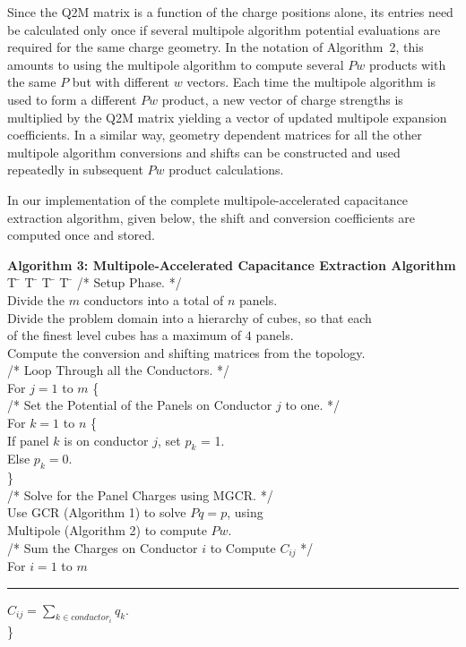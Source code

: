 Since the Q2M matrix is a function of the charge positions alone, its 
entries need be
calculated only once if several multipole algorithm potential evaluations 
are required for the same charge geometry.
In the notation of Algorithm~2, this amounts to using
the multipole algorithm to compute several $Pw$ products with the same $P$ but
with different $w$ vectors.  Each time the multipole algorithm
is used to form a different $Pw$ product, a new vector of charge strengths
is multiplied by the Q2M matrix yielding a vector of updated 
multipole expansion coefficients. In a similar way, geometry dependent matrices
for all the other multipole algorithm conversions and shifts can be constructed
and used repeatedly in subsequent $Pw$ product calculations.

In our implementation of
the complete multipole-accelerated capacitance extraction
algorithm, given below, the shift and conversion coefficients are computed once
and stored.

\begin{tabbing}
{\bf Algorithm 3: Multipole-Accelerated Capacitance Extraction Algorithm}\\[0.2in]
T \= \kill
\>T \= \kill
\>\>T \= \kill
\>\>\>T \= \kill
\> /* Setup Phase. */ \\
\> Divide the $ m $ conductors into a total of $ n $ panels.\\
\> Divide the problem domain into a hierarchy of cubes, so that each \\
\> \> of the finest level cubes has a maximum of $ 4 $ panels.\\
\> Compute the conversion and shifting matrices from the topology.\\
\> /* Loop Through all the Conductors. */\\
\> For $ j = 1 $ to $ m $ \{ \\
\> \> /* Set the Potential of the Panels on Conductor $ j $ to one. */ \\
\> \> For $ k = 1 $ to $ n $ \{ \\
\> \> \> If panel $k$ is on conductor $ j $, set $p_k $ = 1.\\
\> \> \> Else $ p_k = 0 $.\\
\> \> \} \\
\> \> /* Solve for the Panel Charges using MGCR. */\\
\> \> Use GCR (Algorithm 1) to solve $ P q = p $, using \\
\> \> \> Multipole (Algorithm 2) to compute $ P w $.\\
\> \> /* Sum the Charges on Conductor $ i $ to Compute $ C_{ij} $ */\\
\> \> For $ i = 1 $ to $ m $\rule{0.2in}{0in} $ C_{ij} = \sum_{k \in conductor_i} q_k$.\\
\> \}\\[0.2in]
\end{tabbing}

